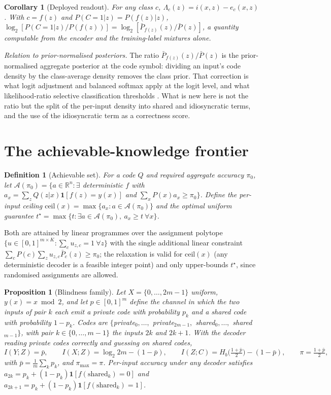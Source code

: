 \documentclass[11pt]{article}
\newtheorem{corollary}{Corollary}
\newtheorem{proposition}{Proposition}
\newtheorem{definition}{Definition}
\begin{document}
\begin{corollary}[Deployed readout]\label{cor:correct}
For any class $c$, $\Lambda_c(z)=i(x,z)-e_c(x,z)$. With $c=f(z)$ and
$P(C=1|z)=P(f(z)|z)$,
$\log_2[P(C=1|z)/P(f(z))]=\log_2[\bar P_{f(z)}(z)/\bar P(z)]$,
a quantity computable from the encoder and the training-label mixtures alone.
\end{corollary}
\emph{Relation to prior-normalised posteriors.} The ratio $\bar P_{f(z)}(z)/\bar P(z)$ is the
prior-normalised aggregate posterior at the code symbol: dividing an input's code density by the
class-average density removes the class prior. That correction is what logit adjustment
\citep{menon2021} and balanced softmax \citep{balanced2020} apply at the logit level, and what
likelihood-ratio selective classification thresholds \citep{heng2025abstain}. What is new here is
not the ratio but the split of the per-input density into shared and idiosyncratic terms, and the
use of the idiosyncratic term as a correctness score.

\section{The achievable-knowledge frontier}\label{sec:frontier}
\begin{definition}[Achievable set]
For a code $Q$ and required aggregate accuracy $\pi_0$, let
$\mathcal A(\pi_0)=\{a\in\mathbb R^n:\exists$ deterministic $f$ with $a_x=\sum_z Q(z|x)\mathbf 1[f(z)=y(x)]$
and $\sum_x P(x)a_x\ge\pi_0\}$. Define the per-input ceiling
$\mathrm{ceil}(x)=\max\{a_x:a\in\mathcal A(\pi_0)\}$ and the optimal uniform guarantee
$t^\star=\max\{t:\exists a\in\mathcal A(\pi_0),\ a_x\ge t\ \forall x\}$.
\end{definition}
Both are attained by linear programmes over the assignment polytope
$\{u\in[0,1]^{m\times K}:\sum_c u_{z,c}=1\ \forall z\}$ with the single additional linear
constraint $\sum_c P(c)\sum_z u_{z,c}\bar P_c(z)\ge\pi_0$; the relaxation is valid for
$\mathrm{ceil}(x)$ (any deterministic decoder is a feasible integer point) and only upper-bounds
$t^\star$, since randomised assignments are allowed.

\begin{proposition}[Blindness family]\label{prop:family}
Let $X=\{0,\dots,2m-1\}$ uniform, $y(x)=x\bmod 2$, and let $p\in[0,1]^m$ define the channel in which the
two inputs of pair $k$ each emit a private code with probability $p_k$ and a shared code with
probability $1-p_k$. Codes are $\{$private$_0,\dots,$ private$_{2m-1},$ shared$_0,\dots,$
shared$_{m-1}\}$, with pair $k\in\{0,\dots,m-1\}$ the inputs $2k$ and $2k+1$. With the decoder reading private codes correctly and guessing on shared codes,
\[
I(Y;Z)=\bar p,\qquad I(X;Z)=\log_2 2m-(1-\bar p),\qquad
I(Z;C)=H_b\!\bigl(\tfrac{1+\bar p}{2}\bigr)-(1-\bar p),\qquad \pi=\tfrac{1+\bar p}{2},
\]
with $\bar p=\frac1m\sum_k p_k$, and $\pi_{\max}=\pi$. Per-input accuracy under any decoder
satisfies $a_{2k}=p_k+(1-p_k)\mathbf 1[f(\text{shared}_k)=0]$ and
$a_{2k+1}=p_k+(1-p_k)\mathbf 1[f(\text{shared}_k)=1]$.
\end{proposition}
\end{document}
